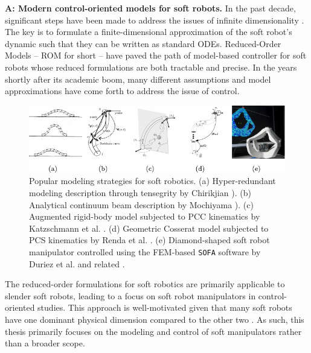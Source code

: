 \textbf{A: Modern control-oriented models for soft robots.} In the past decade, significant steps have been made to address the issues of infinite dimensionality \cite{DellaSantina2021}. The key is to formulate a finite-dimensional approximation of the soft robot's dynamic such that they can be written as standard ODEs. Reduced-Order Models -- ROM for short -- have paved the path of model-based controller for soft robots whose reduced formulations are both tractable and precise. In the years shortly after its academic boom, many different assumptions and model approximations have come forth to address the issue of control.
%
\begin{figure}[!t]
  \centering
  \includegraphics*[width=1.0\textwidth]{./pdf/thesis-figure-1-4.pdf}
  \caption{Popular modeling strategies for soft robotics. (a) Hyper-redundant modeling description through tensegrity by Chirikjian \cite{Chirikjian1992,Chirikjian1994}). (b) Analytical continuum beam description by Mochiyama \cite{Mochiyama1999,Mochiyama2003}). (c) Augmented rigid-body model subjected to PCC kinematics by Katzschmann et al. \cite{Katzschmann2019}. (d) Geometric Cosserat model subjected to PCS kinematics by Renda et al. \cite{Renda2018}. (e) Diamond-shaped soft robot manipulator controlled using the FEM-based \texttt{SOFA} software by Duriez et al. \cite{Duriez2013} and related \cite{Coevoet2017,Goury2018}.}
  \label{fig:C0:modeltypes}
  \vspace{-5mm}
\end{figure}
%
\begin{rmk}
  The reduced-order formulations for soft robotics are primarily applicable to slender soft robots, leading to a focus on soft robot manipulators in control-oriented studies. This approach is well-motivated given that many soft robots have one dominant physical dimension compared to the other two \cite{DellaSantina2021}. As such, this thesis primarily focuses on the modeling and control of soft manipulators rather than a broader scope.
\end{rmk}
